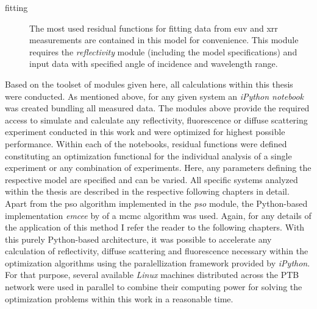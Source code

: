 \begin{description}
 \item[fitting]{The most used residual functions for fitting data from \gls{euv} and \gls{xrr} measurements are contained in this model for convenience. This module requires the \emph{reflectivity} module (including the model specifications) and input data with specified angle of incidence and wavelength range.}
\end{description}

Based on the toolset of modules given here, all calculations within this thesis were conducted. As mentioned above, for any given system an \emph{iPython notebook} was created bundling all measured data. The modules above provide the required access to simulate and calculate any reflectivity, fluorescence or diffuse scattering experiment conducted in this work and were optimized for highest possible performance. Within each of the notebooks, residual functions were defined constituting an optimization functional for the individual analysis of a single experiment or any combination of experiments. Here, any parameters defining the respective model are specified and can be varied. All specific systems analyzed within the thesis are described in the respective following chapters in detail. Apart from the \gls{pso} algorithm implemented in the \emph{pso} module, the Python-based implementation \emph{emcee} by \textcite{foreman-mackey_emcee:_2013} of a \gls{mcmc} algorithm was used. Again, for any details of the application of this method I refer the reader to the following chapters. With this purely Python-based architecture, it was possible to accelerate any calculation of reflectivity, diffuse scattering and fluorescence necessary within the optimization algorithms using the paralellization framework provided by \emph{iPython}. For that purpose, several available \emph{Linux} machines distributed across the PTB network were used in parallel to combine their computing power for solving the optimization problems within this work in a reasonable time.
